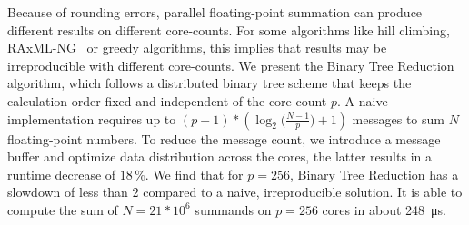 
\Abstract
Because of rounding errors, parallel floating-point summation can produce different results on different core-counts.
For some algorithms like hill climbing, RAxML-NG~\cite{kozlov_raxml-ng_2019} or greedy algorithms, this implies that results may be irreproducible with different core-counts.
We present the Binary Tree Reduction algorithm, which follows a distributed binary tree scheme that keeps the calculation order fixed and independent of the core-count $p$.
A naive implementation requires up to $(p - 1) * (\log_2 \big(\frac{N-1}{p} \big) + 1)$ messages to sum $N$ floating-point numbers.
To reduce the message count, we introduce a message buffer and optimize data distribution across the cores, the latter results in a runtime decrease of $18\,\%$.
We find that for $p=256$, Binary Tree Reduction has a slowdown of less than $2$ compared to a naive, irreproducible solution.
It is able to compute the sum of $N=21 * 10^6$ summands on $p=256$ cores in about \SI{248}{\micro\second}.
